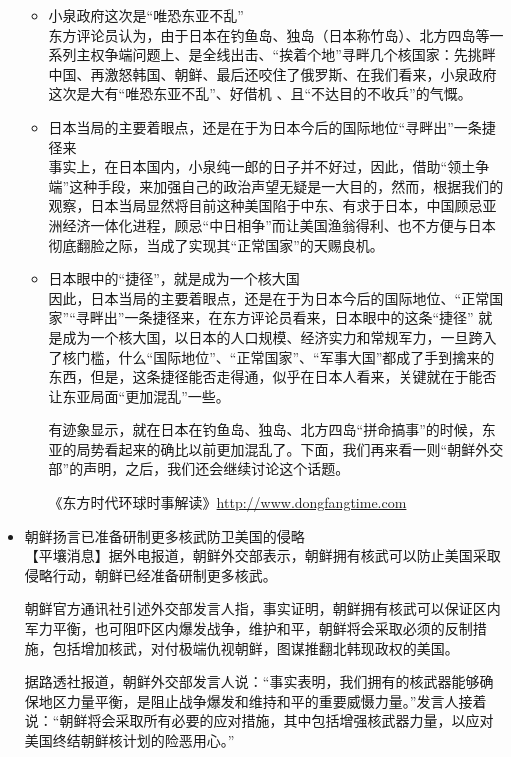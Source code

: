 \documentclass[a4paper,11pt]{article}
\begin{document}
\begin{itemize}
\begin{itemize}
\item 小泉政府这次是“唯恐东亚不乱”\\
\label{sec-4_2_6}%
东方评论员认为，由于日本在钓鱼岛、独岛（日本称竹岛）、北方四岛等一系列主权争端问题上、是全线出击、“挨着个地”寻畔几个核国家：先挑畔中国、再激怒韩国、朝鲜、最后还咬住了俄罗斯、在我们看来，小泉政府这次是大有“唯恐东亚不乱”、好借机
    、且“不达目的不收兵”的气慨。
 
 

\item 日本当局的主要着眼点，还是在于为日本今后的国际地位“寻畔出”一条捷径来\\
\label{sec-4_2_7}%
事实上，在日本国内，小泉纯一郎的日子并不好过，因此，借助“领土争端”这种手段，来加强自己的政治声望无疑是一大目的，然而，根据我们的观察，日本当局显然将目前这种美国陷于中东、有求于日本，中国顾忌亚洲经济一体化进程，顾忌“中日相争”而让美国渔翁得利、也不方便与日本彻底翻脸之际，当成了实现其“正常国家”的天赐良机。
 

\item 日本眼中的“捷径”，就是成为一个核大国\\
\label{sec-4_2_8}%
因此，日本当局的主要着眼点，还是在于为日本今后的国际地位、“正常国家”“寻畔出”一条捷径来，在东方评论员看来，日本眼中的这条“捷径” 就是成为一个核大国，以日本的人口规模、经济实力和常规军力，一旦跨入了核门槛，什么“国际地位”、“正常国家”、“军事大国”都成了手到擒来的东西，但是，这条捷径能否走得通，似乎在日本人看来，关键就在于能否让东亚局面“更加混乱”一些。

    有迹象显示，就在日本在钓鱼岛、独岛、北方四岛“拼命搞事”的时候，东亚的局势看起来的确比以前更加混乱了。下面，我们再来看一则“朝鲜外交部”的声明，之后，我们还会继续讨论这个话题。

    《东方时代环球时事解读》\href{http://www.dongfangtime.com}{http://www.dongfangtime.com}
   
\end{itemize} %

\item 朝鲜扬言已准备研制更多核武防卫美国的侵略\\
\label{sec-4_3}%
【平壤消息】据外电报道，朝鲜外交部表示，朝鲜拥有核武可以防止美国采取侵略行动，朝鲜已经准备研制更多核武。

   朝鲜官方通讯社引述外交部发言人指，事实证明，朝鲜拥有核武可以保证区内军力平衡，也可阻吓区内爆发战争，维护和平，朝鲜将会采取必须的反制措施，包括增加核武，对付极端仇视朝鲜，图谋推翻北韩现政权的美国。

   据路透社报道，朝鲜外交部发言人说：“事实表明，我们拥有的核武器能够确保地区力量平衡，是阻止战争爆发和维持和平的重要威慑力量。”发言人接着说：“朝鲜将会采取所有必要的应对措施，其中包括增强核武器力量，以应对美国终结朝鲜核计划的险恶用心。”



\end{itemize}
\end{document}

